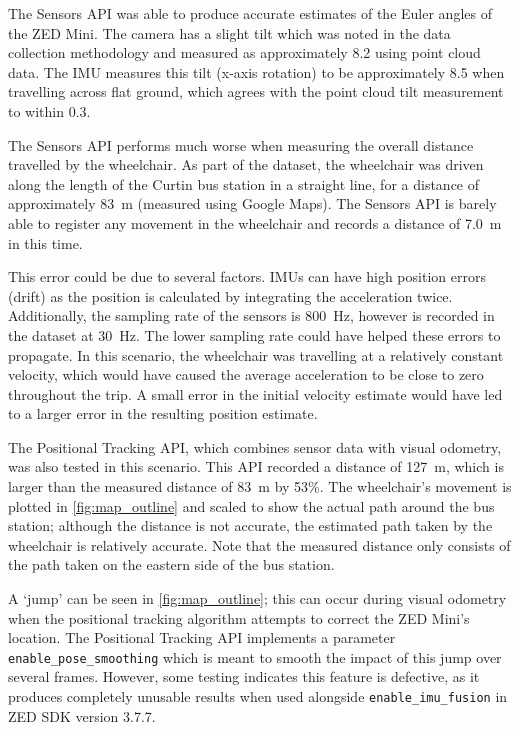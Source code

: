 The Sensors API was able to produce accurate estimates
of the Euler angles of the ZED Mini. The camera has
a slight tilt which was noted in the data collection methodology
and measured as approximately 8.2\degree{} using point cloud data.
The IMU measures this tilt (x-axis rotation) to be approximately 8.5\degree{}
when travelling across flat ground, which agrees with the
point cloud tilt measurement to within 0.3\degree{}.

The Sensors API performs much worse when measuring the overall distance
travelled by the wheelchair. As part of the dataset, the wheelchair was
driven along the length of the Curtin bus station in a straight line,
for a distance of approximately \SI{83}{\metre} (measured using Google Maps).
The Sensors API is barely able to register any movement in the
wheelchair and records a distance of \SI{7.0}{\metre} in this time.

This error could be due to several factors. IMUs can have
high position errors (drift) as the position is calculated
by integrating the acceleration twice.
Additionally, the sampling rate of the sensors is \SI{800}{\hertz},
however is recorded in the dataset at \SI{30}{\hertz}. The lower
sampling rate could have helped these errors to propagate.
In this scenario, the wheelchair was travelling at a relatively constant
velocity, which would have caused the average acceleration to be close to zero throughout
the trip. A small error in the initial velocity estimate would have led to a larger
error in the resulting position estimate.

The Positional Tracking API, which combines sensor data with visual odometry,
was also tested in this scenario. This API recorded
a distance of \SI{127}{\metre}, which is larger
than the measured distance of \SI{83}{\metre} by 53\%.
The wheelchair's movement is plotted in \cref{fig:map_outline} and scaled to
show the actual path around the bus station; although the distance is not accurate,
the estimated path taken by the wheelchair is relatively accurate. Note that the measured distance only
consists of the path taken on the eastern side of the bus station.

A `jump' can be seen in \cref{fig:map_outline}; this can occur during visual odometry when
the positional tracking algorithm attempts to correct the ZED Mini's location. The Positional
Tracking API implements a parameter \texttt{enable\_pose\_smoothing} which is meant
to smooth the impact of this jump over several frames. However, some testing
indicates this feature is defective, as it produces completely unusable results
when used alongside \texttt{enable\_imu\_fusion} in ZED SDK version 3.7.7.

